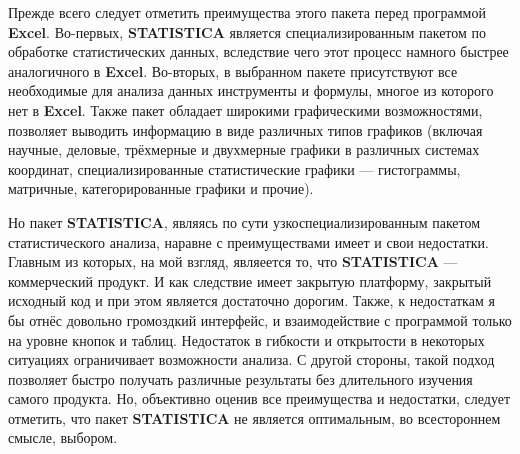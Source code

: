 Прежде всего следует отметить преимущества этого пакета перед программой \textbf{Excel}. Во-первых, \textbf{STATISTICA} является специализированным пакетом по обработке статистических данных, вследствие чего этот процесс намного быстрее аналогичного в \textbf{Excel}. Во-вторых, в выбранном пакете присутствуют все необходимые для анализа данных инструменты и формулы, многое из которого нет в \textbf{Excel}. Также пакет обладает широкими графическими возможностями, позволяет выводить информацию в виде различных типов графиков (включая научные, деловые, трёхмерные и двухмерные графики в различных системах координат, специализированные статистические графики --- гистограммы, матричные, категорированные графики и прочие).

Но пакет \textbf{STATISTICA}, являясь по сути узкоспециализированным пакетом статистического анализа, наравне с преимуществами имеет и свои недостатки. Главным из которых, на мой взгляд, являеется то, что \textbf{STATISTICA} --- коммерческий продукт. И как следствие имеет закрытую платформу, закрытый исходный код и при этом является достаточно дорогим. Также, к недостаткам я бы отнёс довольно громоздкий интерфейс, и взаимодействие с программой только на уровне кнопок и таблиц. Недостаток в гибкости и открытости в некоторых ситуациях ограничивает возможности анализа. С другой стороны, такой подход позволяет быстро получать различные результаты без длительного изучения самого продукта. Но, объективно оценив все преимущества и недостатки, следует отметить, что пакет \textbf{STATISTICA} не является оптимальным, во всестороннем смысле, выбором.

